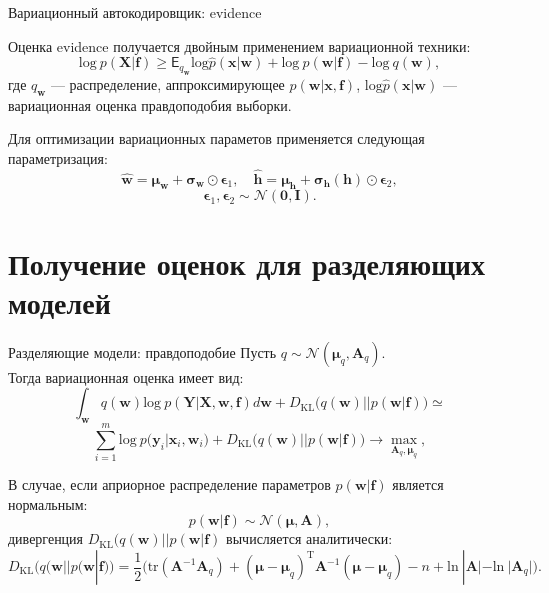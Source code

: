 \documentclass[10pt,pdf,utf8,russian,aspectratio=169]{beamer}
\begin{document}
\begin{frame}{Вариационный автокодировщик: evidence}

Оценка evidence получается двойным применением вариационной техники:
$$
\text{log}~p(\mathbf{X}|\mathbf{f}) \geq \mathsf{E}_{q_\mathbf{w}} \text{log}\hat{p}(\mathbf{x}|\mathbf{w}) + \text{log}~p(\mathbf{w}|\mathbf{f}) - \text{log}~q(\mathbf{w}),
$$
где $q_\mathbf{w}$ --- распределение, аппроксимирующее $p(\mathbf{w}|\mathbf{x}, \mathbf{f})$, $ \text{log}\hat{p}(\mathbf{x}|\mathbf{w})$ --- вариационная оценка правдоподобия выборки.

Для оптимизации вариационных параметов применяется следующая параметризация:
$$
\hat{\mathbf{w}} = \boldsymbol{\mu}_\mathbf{w} + \boldsymbol{\sigma}_{\mathbf{w}}\odot \boldsymbol{\epsilon}_1,\quad \hat{\mathbf{h}} = \boldsymbol{\mu}_\mathbf{h} + \boldsymbol{\sigma}_\mathbf{h}(\mathbf{h})\odot \boldsymbol{\epsilon}_2, 
$$
$$
\boldsymbol{\epsilon}_1, \boldsymbol{\epsilon}_2 \sim \mathcal{N}(\mathbf{0}, \mathbf{I}).
$$

\end{frame}
\section{Получение оценок для разделяющих моделей}
\begin{frame}{Разделяющие модели: правдоподобие}
Пусть $q \sim \mathcal{N}(\boldsymbol{\mu}_q, \mathbf{A}_q).$\\
Тогда вариационная оценка имеет вид:
$$
\int_{\mathbf{w}} q(\mathbf{w})\text{log}~{p(\mathbf{Y}|\mathbf{X},\mathbf{w},\mathbf{f})} d \mathbf{w} + D_\text{KL}\bigl(q (\mathbf{w} )|| p (\mathbf{w}|\mathbf{f})\bigr) \simeq
$$
$$
\sum_{i=1}^m \text{log}~p(\mathbf{y}_i|\mathbf{x}_i, \mathbf{w}_i) + D_\text{KL}\bigl(q (\mathbf{w} )|| p (\mathbf{w}|\mathbf{f})\bigr) \to \max_{\mathbf{A}_q, \boldsymbol{\mu}_q},
$$

В случае, если априорное распределение параметров $p(\mathbf{w}|\mathbf{f})$ является нормальным: 
$$
p(\mathbf{w}|\mathbf{f}) \sim \mathcal{N}(\boldsymbol{\mu}, \mathbf{A}),
$$
дивергенция $D_\text{KL}\bigl(q (\mathbf{w} )|| p (\mathbf{w}|\mathbf{f})$ вычисляется аналитически:
$$
D_\text{KL}\bigl(q (\mathbf{w} || p (\mathbf{w}|\mathbf{f})\bigr) = \frac{1}{2} \bigl( \text{tr} (\mathbf{A}^{-1}\mathbf{A}_q) + (\boldsymbol{\mu} - \boldsymbol{\mu}_q)^\text{T}\mathbf{A}^{-1}(\boldsymbol{\mu} - \boldsymbol{\mu}_q) - n +\text{ln}~|\mathbf{A}| - \text{ln}~|\mathbf{A}_q| \bigr).
$$
\end{frame}
\end{document}
